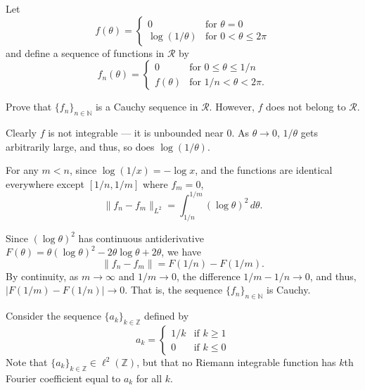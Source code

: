 \documentclass[12 pt, letterpaper]{hmcpset}
\begin{document}
\begin{problem}[S \& S \S 3.3 \#5]
	Let
	\[
		f(\theta) = \begin{cases}
			0 & \text{for } \theta = 0 \\
			\log(1 / \theta) & \text{for } 0 < \theta \le 2 \pi
		\end{cases}
	\]
	and define a sequence of functions in $\mathcal{R}$ by
	\[
		f_{n}(\theta) = \begin{cases}
			0 & \text{for } 0 \le \theta \le 1 / n \\
			f(\theta) &  \text{for } 1/n < \theta < 2 \pi.
		\end{cases}
	\]

	Prove that $\{ f_{n} \}_{n \in \mathbb{N}}$ is a Cauchy sequence in $\mathcal{R}$. However, $f$ does not belong to $\mathcal{R}$.
\end{problem}

\begin{solution}
	Clearly $f$ is not integrable --- it is unbounded near $0$. As $\theta \to 0$, $1 / \theta$ gets arbitrarily large, and thus, so does $\log(1 / \theta)$.

	For any $m < n$, since $\log(1 / x) = - \log x$, and the functions are identical everywhere except $[1/n, 1/m]$ where $f_{m} = 0$,
	\[
		\lVert f_{n} - f_{m} \rVert_{L^{2}} = \int_{1/n}^{1/m} (\log \theta)^{2} \, d\theta.
	\]

	Since $(\log \theta)^{2}$ has continuous antiderivative $F(\theta) = \theta (\log \theta)^{2} - 2 \theta \log \theta + 2 \theta$, we have
	\[
		\lVert f_{n} - f_{m} \rVert = F(1 / n) - F(1/m).
	\]
	By continuity, as $m \to \infty$ and $1/m \to 0$, the difference $1/m - 1/n \to 0$, and thus, $\lvert F(1 / m) - F(1 / n) \rvert \to 0$. That is, the sequence $\{ f_{n} \}_{n \in \mathbb{N}}$ is Cauchy.
\end{solution}

\pagebreak

\begin{problem}[S \& S \S 3.3 \#6]
	Consider the sequence $\{ a_{k} \}_{k \in \mathbb{Z}}$ defined by
	\[
		a_{k} = \begin{cases}
			1 / k & \text{if } k \ge 1 \\
			0 & \text{if } k \le 0
		\end{cases}
	\]
	Note that $\{ a_{k} \}_{k \in \mathbb{Z}} \in \ell^{2}(\mathbb{Z})$, but that no Riemann integrable function has $k$th Fourier coefficient equal to $a_{k}$ for all $k$.
\end{problem}
\end{document}
